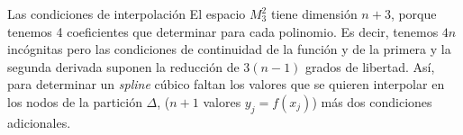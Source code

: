 \begin{frame}{Las condiciones de interpolación}
    El espacio $M_3^2$ tiene dimensión $n+3$, porque tenemos 4 coeficientes que determinar 
    para cada polinomio. Es decir, tenemos $4n$ incógnitas pero las condiciones de continuidad
    de la función y de la primera y la segunda derivada suponen la reducción de $3(n-1)$ grados de libertad.
    Así, para determinar un \textit{spline} cúbico faltan los valores que se quieren interpolar en los nodos 
    de la partición $\Delta$, ($n + 1$ valores $y_j = f (x_j)$) más dos condiciones adicionales.
\end{frame}